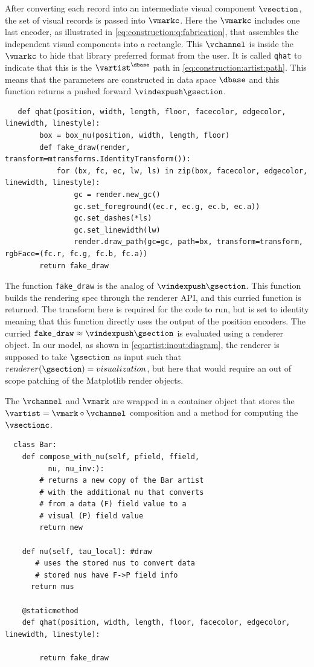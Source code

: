 \documentclass[10pt,journal,compsoc]{IEEEtran}
\theoremstyle{definition}
\theoremstyle{remark}
\begin{document}
After converting each record into an intermediate visual component $\vsection$, the set of visual records is passed into $\vmarkc$. Here the $\vmarkc$ includes one last encoder, as illustrated in \autoref{eq:construction:q:fabrication}, that assembles the independent visual components into a rectangle. This $\vchannel$ is inside the $\vmarkc$ to hide that library preferred format from the user. It is called \texttt{qhat} to indicate that this is the $\vartist^{\dbase}$ path in \autoref{eq:construction:artist:path}.  This means that the parameters are constructed in data space $\dbase$ and this function returns a pushed forward $\vindexpush\gsection$. 

\begin{verbatim}
   def qhat(position, width, length, floor, facecolor, edgecolor, linewidth, linestyle): 
        box = box_nu(position, width, length, floor)
        def fake_draw(render, transform=mtransforms.IdentityTransform()):
            for (bx, fc, ec, lw, ls) in zip(box, facecolor, edgecolor, linewidth, linestyle):
                gc = render.new_gc()
                gc.set_foreground((ec.r, ec.g, ec.b, ec.a))
                gc.set_dashes(*ls)
                gc.set_linewidth(lw)
                render.draw_path(gc=gc, path=bx, transform=transform, rgbFace=(fc.r, fc.g, fc.b, fc.a))
        return fake_draw
\end{verbatim}
The function \texttt{fake\_draw} is the analog of $\vindexpush\gsection$. This function builds the rendering spec through the renderer API, and this curried function is returned. The transform here is required for the code to run, but is set to identity meaning that this function directly uses the output of the position encoders. The curried $\texttt{fake\_draw} \approx \vindexpush \gsection$ is evaluated using a renderer object. In our model, as shown in \autoref{eq:artist:inout:diagram}, the renderer is supposed to take $\gsection$ as input such that $renderer(\gsection) = visualization$, but here that would require an out of scope patching of the Matplotlib render objects. 

The $\vchannel$ and $\vmark$ are wrapped in a container object that stores the $\vartist = \vmark \circ \vchannel$ composition and a method for computing the $\vsectionc$.
\begin{verbatim}
  class Bar: 
    def compose_with_nu(self, pfield, ffield, 
          nu, nu_inv:):
        # returns a new copy of the Bar artist 
        # with the additional nu that converts 
        # from a data (F) field value to a 
        # visual (P) field value
        return new

    def nu(self, tau_local): #draw
       # uses the stored nus to convert data
       # stored nus have F->P field info
      return mus
    
    @staticmethod
    def qhat(position, width, length, floor, facecolor, edgecolor, linewidth, linestyle):
       
        return fake_draw
\end{verbatim}
\end{document}
